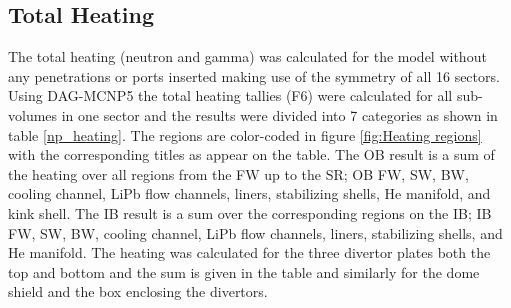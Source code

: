 \documentclass[12pt, letterpaper]{elsarticle}
\begin{document}
\subsection{Total Heating}
The total heating (neutron and gamma) was calculated for the model without any penetrations or ports inserted making use of the symmetry of all 16 sectors. Using DAG-MCNP5 the total heating tallies (F6) were calculated for all sub-volumes in one sector and the results were divided into 7 categories as shown in table \ref{np_heating}. The regions are color-coded in figure \ref{fig:Heating regions} with the corresponding titles as appear on the table. The OB result is a sum of the heating over all regions from the FW up to the SR; OB FW, SW, BW, cooling channel, LiPb flow channels, liners, stabilizing shells, He manifold, and kink shell. The IB result is a sum over the corresponding regions on the IB; IB FW, SW, BW, cooling channel, LiPb flow channels, liners, stabilizing shells, and He manifold. The heating was calculated for the three divertor plates both the top and bottom and the sum is given in the table and similarly for the dome shield and the box enclosing the divertors. \vspace{5mm}
\end{document}
